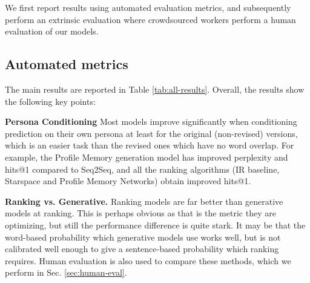 We first report results using automated evaluation metrics, and subsequently perform an extrinsic evaluation where crowdsourced workers perform a human evaluation of our models. 

\subsection{Automated metrics}

The main results are reported in Table \ref{tab:all-results}.
%
Overall, the results show the following key points:

{\bf Persona Conditioning} Most models improve significantly when conditioning prediction on their own persona %
 at least for the original (non-revised) versions, which is an easier task than the revised ones which have no word overlap. For example, the Profile Memory generation model has improved perplexity and hits@1 compared to Seq2Seq, and all the ranking algorithms (IR baseline, Starspace and Profile Memory Networks) obtain improved hits@1.


{\bf Ranking vs. Generative.} Ranking models are far better than generative models at ranking. This is perhaps obvious as that is the metric they are optimizing, but still the performance difference is quite stark. 
It may be that the word-based probability which generative models use works well, but is not calibrated well enough to give a sentence-based probability which ranking requires.
Human evaluation is also used to compare these methods, which we perform in Sec. \ref{sec:human-eval}.

